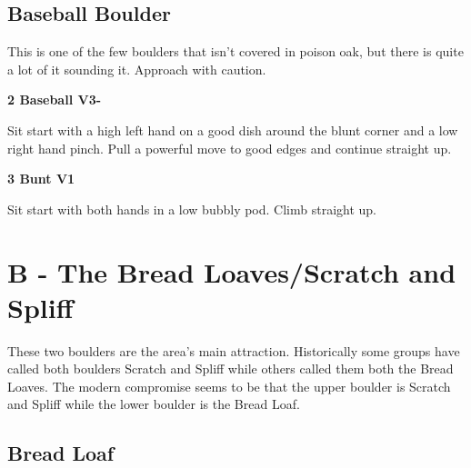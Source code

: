 \begin{multicols}{2}
\begin{minipage}{\columnwidth}
			\subsection*{Baseball Boulder}\label{bf:Baseball Boulder}
			This is one of the few boulders that isn't covered in poison oak, but there is quite a lot of it sounding it. Approach with caution.
			
			\end{minipage}
			

					\begin{minipage}{\linewidth}	
					\label{rt:Baseball}
\colorbox{green!20}{
\parbox{0.95\textwidth}{
\textbf{
2 Baseball V3-   
}
}
}

					\begin{adjustwidth}{0.5cm}{}				
					Sit start with a high left hand on a good dish around the blunt corner and a low right hand pinch. Pull a powerful move to good edges and continue straight up.
					\end{adjustwidth}
					\end{minipage}
					\begin{minipage}{\linewidth}	
					\label{rt:Bunt}
\colorbox{green!20}{
\parbox{0.95\textwidth}{
\textbf{
3 Bunt V1   
}
}
}

					\begin{adjustwidth}{0.5cm}{}				
					Sit start with both hands in a low bubbly pod. Climb straight up.
					\end{adjustwidth}
					\end{minipage}
\newpage

		\section{B - The Bread Loaves/Scratch and Spliff}\label{sa:The Bread Loaves/Scratch and Spliff}
	\begin{minipage}{\columnwidth}
	These two boulders are the area's main attraction. Historically some groups have called both boulders Scratch and Spliff while others called them both the Bread Loaves. The modern compromise seems to be that the upper boulder is Scratch and Spliff while the lower boulder is the Bread Loaf.
	\end{minipage}
	
			\begin{minipage}{\columnwidth}
			\subsection*{Bread Loaf}\label{bf:Bread Loaf}
			\
			

\end{minipage}
\end{multicols}
